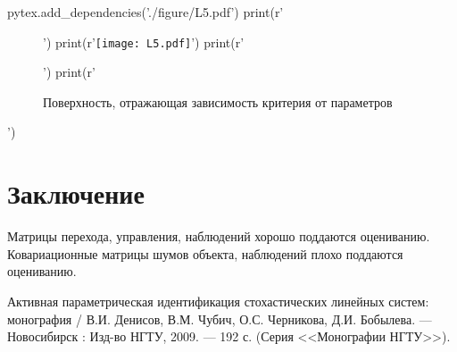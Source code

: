 \documentclass[a4paper,14pt]{extarticle}
\renewcommand{\baselinestretch}{1.5}
\begin{document}
\begin{pycode}
pytex.add_dependencies('./figure/L5.pdf')
print(r'\begin{figure}[H]')
print(r'\texttt{[image: L5.pdf]}')
print(r'\caption{Поверхность, отражающая зависимость критерия от параметров}')
print(r'\end{figure}')
\end{pycode}

\section{Заключение}

Матрицы перехода, управления, наблюдений хорошо поддаются оцениванию.
Ковариационные матрицы шумов объекта, наблюдений плохо поддаются оцениванию.

\begin{thebibliography}{9}

\begin{sloppypar}

 Активная параметрическая идентификация стохастических линейных
  систем: монография / В.И. Денисов, В.М. Чубич, О.С. Черникова, Д.И. Бобылева.
    --- Новосибирск : Изд-во НГТУ, 2009. --- 192 с.
    (Серия <<Монографии НГТУ>>).

\end{sloppypar}

\end{thebibliography}

\renewcommand{\baselinestretch}{1}
\end{document}
